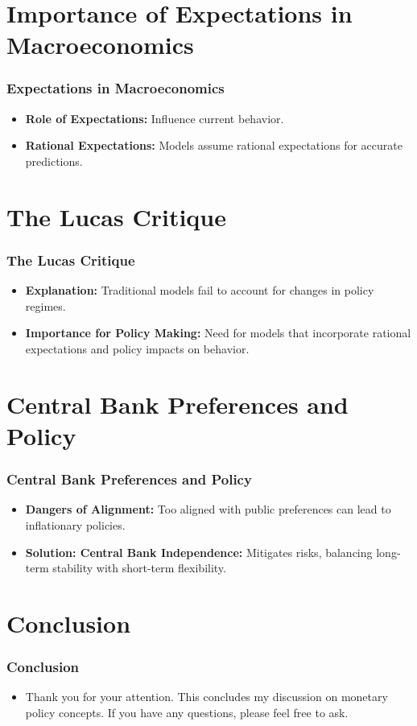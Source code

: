 \documentclass{beamer}
\begin{document}
\section{Importance of Expectations in Macroeconomics}

\begin{frame}
    \frametitle{Expectations in Macroeconomics}
    \begin{itemize}
        \item \textbf{Role of Expectations:} Influence current behavior.
        \item \textbf{Rational Expectations:} Models assume rational expectations for accurate predictions.
    \end{itemize}
\end{frame}

\section{The Lucas Critique}

\begin{frame}
    \frametitle{The Lucas Critique}
    \begin{itemize}
        \item \textbf{Explanation:} Traditional models fail to account for changes in policy regimes.
        \item \textbf{Importance for Policy Making:} Need for models that incorporate rational expectations and policy impacts on behavior.
    \end{itemize}
\end{frame}

\section{Central Bank Preferences and Policy}

\begin{frame}
    \frametitle{Central Bank Preferences and Policy}
    \begin{itemize}
        \item \textbf{Dangers of Alignment:} Too aligned with public preferences can lead to inflationary policies.
        \item \textbf{Solution: Central Bank Independence:} Mitigates risks, balancing long-term stability with short-term flexibility.
    \end{itemize}
\end{frame}

\section{Conclusion}

\begin{frame}
    \frametitle{Conclusion}
    \begin{itemize}
        \item Thank you for your attention. This concludes my discussion on monetary policy concepts. If you have any questions, please feel free to ask.
    \end{itemize}
\end{frame}
\end{document}
